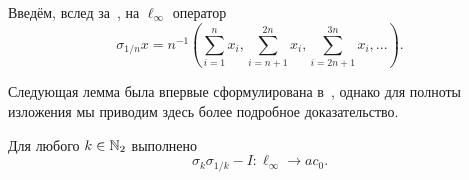 Введём, вслед за~\cite[с. 131, утверждение 2.b.2]{lindenstrauss1979classical},
на $\ell_\infty$ оператор
\begin{equation}
	\sigma_{1/n} x = n^{-1}
	\left(
		\sum_{i=1}^{n} x_i,
		\sum_{i=n+1}^{2n} x_i,
		\sum_{i=2n+1}^{3n} x_i,
		...
	\right).
\end{equation}

Следующая лемма была впервые сформулирована в~\cite{ASSU2},
однако для полноты изложения мы приводим здесь более подробное доказательство.

\begin{lemma}
	Для любого $k\in\mathbb{N}_2$ выполнено
	\begin{equation}
		\sigma_k \sigma_{1/k} - I : \ell_\infty \to ac_0
		.
	\end{equation}
\end{lemma}

